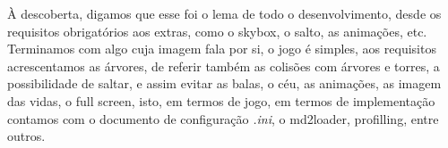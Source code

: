 À descoberta, digamos que esse foi o lema de todo o desenvolvimento, desde os requisitos obrigatórios aos extras, como o skybox, o salto, as animações, etc. Terminamos com algo cuja imagem fala por si, o jogo é simples, aos requisitos acrescentamos as árvores, de referir também as colisões com árvores e torres, a possibilidade de saltar, e assim evitar as balas, o céu, as animações, as imagem das vidas, o full screen, isto, em termos de jogo, em termos de implementação contamos com o documento de configuração \textit{.ini}, o md2loader, profilling, entre outros.
